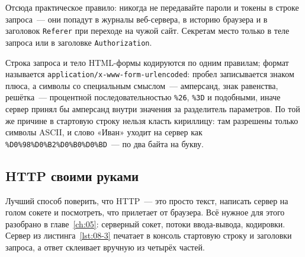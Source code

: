 Отсюда практическое правило: никогда не передавайте пароли и токены в строке
запроса~--- они попадут в журналы веб-сервера, в историю браузера и в заголовок
\texttt{Referer} при переходе на чужой сайт. Секретам место только в теле
запроса или в заголовке \texttt{Authorization}.

Строка запроса и тело HTML-формы кодируются по одним правилам; формат
называется \texttt{application/x-www-form-urlencoded}: пробел записывается
знаком плюса, а символы со специальным смыслом~--- амперсанд, знак равенства,
решётка~--- процентной последовательностью \texttt{\%26}, \texttt{\%3D} и
подобными, иначе сервер принял бы амперсанд внутри значения за разделитель
параметров. По той же причине в стартовую строку нельзя класть кириллицу: там
разрешены только символы ASCII, и слово «Иван» уходит на сервер как
\texttt{\%D0\%98\%D0\%B2\%D0\%B0\%D0\%BD}~--- по два байта на букву.

\subsection{HTTP своими руками}

Лучший способ поверить, что HTTP~--- это просто текст, написать сервер на голом
сокете и посмотреть, что прилетает от браузера. Всё нужное для этого разобрано
в главе~\ref{ch:05}: серверный сокет, потоки ввода-вывода, кодировки. Сервер из
листинга~\ref{lst:08-3} печатает в консоль стартовую строку и заголовки
запроса, а ответ склеивает вручную из четырёх частей.

